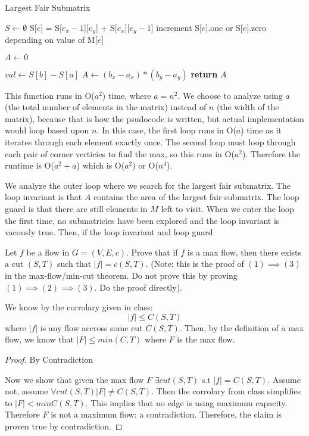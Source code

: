 \documentclass{article}
\begin{document}
\begin{algorithm}
\caption{Largest Fair Submatrix}\label{guests}
\begin{algorithmic}[1]
	\State $S \gets \emptyset$
			\State S[$e$] = S[$e_x - 1$][$e_y$] + S[$e_x$][$e_y - 1$]
			\State increment S[$e$].one or S[$e$].zero depending on value of M[$e$]
		\EndFor
	\EndFor
	
	$A \gets 0$
	
			\State $val \gets S[b] - S[a]$
					\State $A \gets (b_x - a_x) * (b_y - a_y)$
				\EndIf
			\EndIf
		\EndFor
	\EndFor
	\State \textbf{return} $A$
\EndFunction
\end{algorithmic}
\end{algorithm}

This function runs in O($a^2$) time, where $a = n^2$. We choose to analyze using $a$ (the total number of elements in the matrix) instead of $n$ (the width of the matrix), because that is how the psudocode is written, but actual implementation would loop based upon $n$. In this case, the first loop runs in O($a$) time as it iterates through each element exactly once. The second loop must loop through each pair of corner verticies to find the max, so this runs in O($a^2$). Therefore the runtime is O($a^2 + a$) which is O($a^2$) or O($n^4$).

We analyze the outer loop where we search for the largest fair submatrix. The loop invariant is that $A$ contains the area of the largest fair submatrix. The loop guard is that there are still elements in $M$ left to visit. When we enter the loop the first time, no submatricies have been explored and the loop invariant is vacously true. Then, if the loop invariant and loop guard 

\nextprob
Let $f$ be a flow in $G=(V,E,c)$.  Prove that if $f$ is a max flow, then there
exists a cut $(S,T)$ such that $|f| = c(S,T)$.  (Note: this is the proof of $(1)
\implies (3)$ in the max-flow/min-cut theorem.  Do not prove this by proving
$(1) \implies (2) \implies (3)$.  Do the proof directly).

We know by the corrolary given in class:
$$\left | f \right | \leq C(S,T)$$
where $\left | f \right |$ is any flow accross some cut $C(S,T)$. 
Then, by the definition of a max flow, we know that $\left | F \right | \leq min(C,T)$ where $F$ is the max flow.

\begin{proof} By Contradiction

Now we show that given the max flow $F$ $\exists cut(S,T)$ s.t $\left | f \right | = C(S,T)$. Assume not, assume $\forall cut(S,T) \left | F \right | \neq C(S,T)$. Then the corrolary from class simplifies to $\left | F \right | < min C(S,T)$. This implies that no edge is using maximum capacity. Therefore $F$ is not a maximum flow: a contradiction. Therefore, the claim is proven true by contradiction.
\end{proof}
\end{document}
